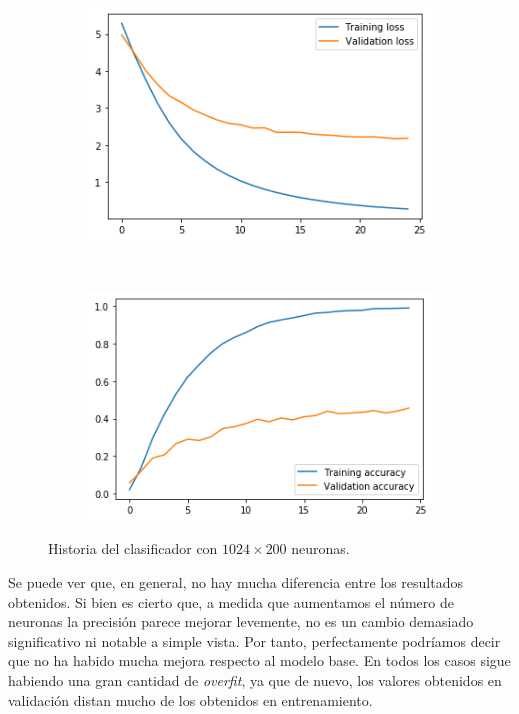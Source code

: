 \documentclass[11pt,a4paper]{article}
\begin{document}
\begin{figure}[H]
  \centering
  \begin{subfigure}{.5\textwidth}
    \centering
    \includegraphics[scale=0.4]{img/feat-m3-loss.png}
    \label{fig:feat-m3-loss}
  \end{subfigure}%
  ~ \quad
  \begin{subfigure}{.5\textwidth}
    \centering
    \includegraphics[scale=0.4]{img/feat-m3-acc.png}
    \label{fig:feat-m3-acc}
  \end{subfigure}
  \caption{Historia del clasificador con $1024 \times 200$ neuronas.}
  \label{fig:history-feat-m3}
\end{figure}

Se puede ver que, en general, no hay mucha diferencia entre los resultados obtenidos.
Si bien es cierto que, a medida que aumentamos el número de neuronas la precisión parece
mejorar levemente, no es un cambio demasiado significativo ni notable a simple vista.
Por tanto, perfectamente podríamos decir que no ha habido mucha mejora respecto al modelo
base. En todos los casos sigue habiendo una gran cantidad de \textit{overfit},
ya que de nuevo, los valores obtenidos en validación distan mucho de los obtenidos en
entrenamiento.
\end{document}
